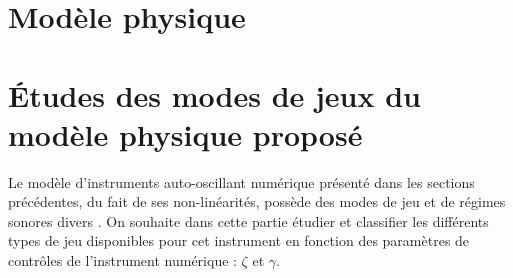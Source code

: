 \documentclass[french, twocolumn]{article}
\begin{document}











\section{Modèle physique}









\section{Études des modes de jeux du modèle physique proposé}\label{sec:descripteurs}%
Le modèle d'instruments auto-oscillant numérique présenté dans les sections précédentes, du fait de ses non-linéarités, possède des modes de jeu et de régimes sonores divers \cite{missoum_explicit_2014}\cite{doc2014minimal}. On souhaite dans cette partie étudier et classifier les différents types de jeu disponibles pour cet instrument en fonction des paramètres de contrôles de l'instrument numérique : $\zeta$ et $\gamma$. 
\end{document}

